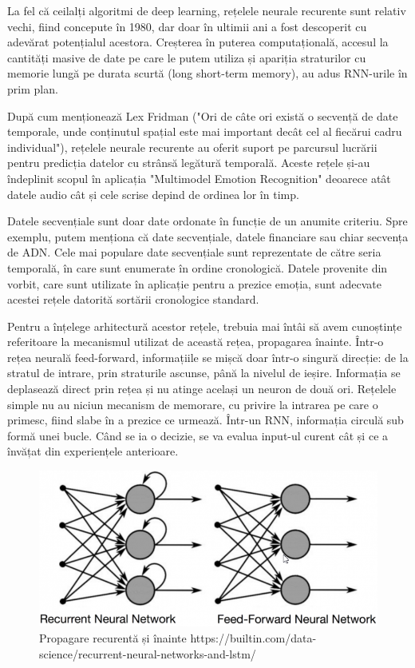 \documentclass[a4paper, 12pt]{report}
\begin{document}
	La fel că ceilalți algoritmi de deep learning, rețelele neurale recurente sunt relativ vechi, fiind concepute în 1980, dar doar în ultimii ani a fost descoperit cu adevărat potențialul acestora. Creșterea în puterea computațională, accesul la cantități masive de date pe care le putem utiliza și apariția straturilor cu memorie lungă pe durata scurtă (long short-term memory), au adus RNN-urile în prim plan.

	După cum menționează Lex Fridman ("Ori de câte ori există o secvență de date temporale, unde conținutul spațial este mai important decât cel al fiecărui cadru individual"), rețelele neurale recurente au oferit suport pe parcursul lucrării pentru predicția datelor cu strânsă legătură temporală. Aceste rețele și-au îndeplinit scopul în aplicația "Multimodel Emotion Recognition" deoarece atât datele audio cât și cele scrise depind de ordinea lor în timp.

	Datele secvențiale sunt doar date ordonate în funcție de un anumite criteriu. Spre exemplu, putem menționa că date secvențiale, datele financiare sau chiar secvența de ADN. Cele mai populare date secvențiale sunt reprezentate de către seria temporală, în care sunt enumerate în ordine cronologică. Datele provenite din vorbit, care sunt utilizate în aplicație pentru a prezice emoția, sunt adecvate acestei rețele datorită sortării cronologice standard.

	Pentru a înțelege arhitectură acestor rețele, trebuia mai întâi să avem cunoștințe referitoare la mecanismul utilizat de această rețea, propagarea înainte. Într-o rețea neurală feed-forward, informațiile se mișcă doar într-o singură direcție: de la stratul de intrare, prin straturile ascunse, până la nivelul de ieșire. Informația se deplasează direct prin rețea și nu atinge același un neuron de două ori. Rețelele simple nu au niciun mecanism de memorare, cu privire la intrarea pe care o primesc, fiind slabe în a prezice ce urmează. Într-un RNN, informația circulă sub formă unei bucle. Când se ia o decizie, se va evalua input-ul curent cât și ce a învățat din experiențele anterioare.
	
	\begin{figure}[H]
		\begin{center}
			\includegraphics[scale=0.47]{images/fwd_recc.png}
		\end{center}
		\caption{Propagare recurentă și înainte\newline
			\hspace{\linewidth}https://builtin.com/data-science/recurrent-neural-networks-and-lstm/}
		\label{fig:fwd_recc}
	\end{figure} 
\end{document}
